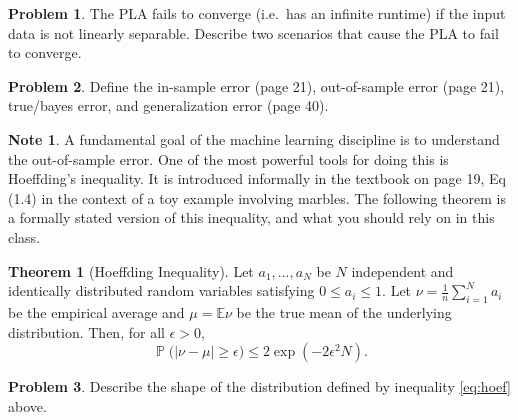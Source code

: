 \documentclass[10pt]{exam}
\theoremstyle{definition}
\newtheorem{problem}{Problem}
\newtheorem{note}{Note}
\newtheorem{theorem}{Theorem}
\newcommand{\E}{\mathbb E}
\DeclareMathOperator{\prob}{\mathbb P}
\begin{document}
\newpage
\begin{problem}
    The PLA fails to converge (i.e.\ has an infinite runtime) if the input data is not linearly separable.
    Describe two scenarios that cause the PLA to fail to converge.
\end{problem}
\vspace{4in}

\begin{problem}
        Define the in-sample error (page 21), out-of-sample error (page 21), true/bayes error, and generalization error (page 40).
\end{problem}

\vspace{4in}

\newpage
\begin{note}
A fundamental goal of the machine learning discipline is to understand the out-of-sample error.
One of the most powerful tools for doing this is Hoeffding's inequality.
It is introduced informally in the textbook on page 19, Eq (1.4) in the context of a toy example involving marbles.
The following theorem is a formally stated version of this inequality,
and what you should rely on in this class.
\end{note}
\begin{theorem}[Hoeffding Inequality]
    Let $a_1, ..., a_N$ be $N$ independent and identically distributed random variables satisfying $0 \le a_i \le 1$.
    Let $\nu = \tfrac1n\sum_{i=1}^N a_i$ be the empirical average and $\mu = \E \nu$ be the true mean of the underlying distribution.
    Then, for all $\epsilon > 0$,
    \begin{equation}
        \label{eq:hoef}
        \prob\big(|\nu - \mu| \ge \epsilon\big)
        \le 
        2 \exp (-2\epsilon^2 N)
        .
    \end{equation}
\end{theorem}
\begin{problem}
Describe the shape of the distribution defined by inequality \ref{eq:hoef} above.
\end{problem}

        \newpage
\end{document}
